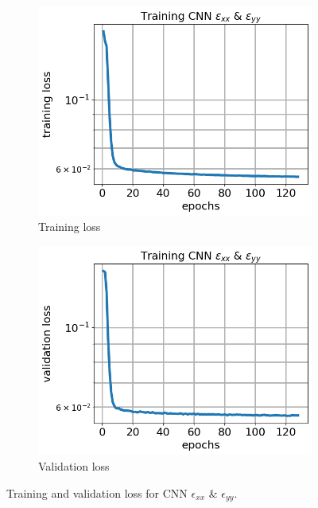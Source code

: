 \documentclass[12pt]{article}
\newcommand{\nhgfigheight}{4.0cm}
\begin{document}
%
\begin{figure}
  \centering
  \begin{subfigure}[b]{0.45\linewidth}
    \includegraphics[totalheight=\nhgfigheight]{Figures/final/training/exxeyy/field_strainxxyy_plot_loss.png}
    \caption{Training loss}
  \end{subfigure}
  \begin{subfigure}[b]{0.45\linewidth}
    \includegraphics[totalheight=\nhgfigheight]{Figures/final/training/exxeyy/field_strainxxyy_plot_val_loss.png}
    \caption{Validation loss}
  \end{subfigure}
\caption{\label{fig:oneinc:trainexxeyy} Training and validation loss for CNN $\epsilon_{xx}$ \& $\epsilon_{yy}$.}
\end{figure}
\end{document}
